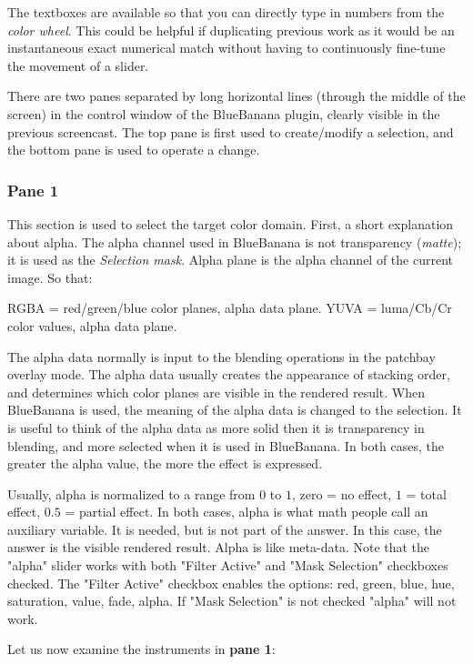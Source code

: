 The textboxes are available so that you can directly type in numbers from the \textit{color wheel}. This could be helpful if duplicating previous work as it would be an instantaneous exact numerical match without having to continuously fine-tune the movement of a slider.

There are two panes separated by long horizontal lines (through the middle of the screen) in the control window of the BlueBanana plugin, clearly visible in the previous screencast. The top pane is first used to create/modify a selection, and the bottom pane is used to operate a change.

\subsubsection*{Pane 1}
\label{ssub:pane1}

This section is used to select the target color domain. First, a short explanation about alpha. The alpha channel used in BlueBanana is not transparency (\textit{matte}); it is used as the \textit{Selection mask}. Alpha plane is the alpha channel of the current image. So that:

RGBA = red/green/blue color planes, alpha data plane.
YUVA = luma/Cb/Cr color values, alpha data plane.

The alpha data normally is input to the blending operations in the patchbay overlay mode. The alpha data usually creates the appearance of stacking order, and determines which color planes are visible in the rendered result. When BlueBanana is used, the meaning of the alpha data is changed to the selection. It is useful to think of the alpha data as more solid then it is transparency in blending, and more selected when it is used in BlueBanana. In both cases, the greater the alpha value, the more the effect is expressed.

Usually, alpha is normalized to a range from $0$ to $1$, zero = no effect, $1$ = total effect, $0.5$ = partial effect. In both cases, alpha is what math people call an auxiliary variable. It is needed, but is not part of the answer. In this case, the answer is the visible rendered result. Alpha is like meta-data.  Note that the "alpha" slider works with both "Filter Active" and "Mask Selection" checkboxes
checked.  The "Filter Active" checkbox enables the options: red, green, blue, hue, saturation, value, fade, alpha.  If "Mask Selection" is not checked "alpha" will not work.

Let us now examine the instruments in \textbf{pane 1}:

